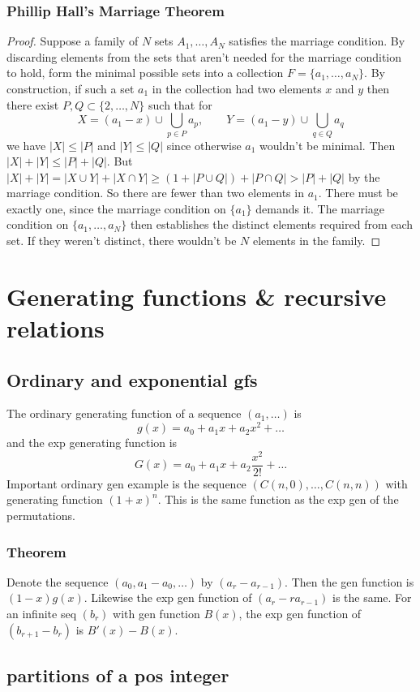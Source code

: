 \documentclass{article}
\begin{document}
\subsubsection{Phillip Hall's Marriage Theorem}
\begin{proof}
Suppose a family of $N$ sets $A_1, \hdots, A_N$ satisfies the marriage condition.
By discarding elements from the sets
that aren't needed for the marriage condition to hold,
form the minimal possible sets into a collection $F = \{ a_1, \hdots, a_N \}$.
By construction, if such a set $a_1$ in the collection
had two elements $x$ and $y$ then there exist $P,Q \subset \{2,\hdots, N\}$ such that for
$$
X = (a_1 - x) \cup \bigcup_{p \in P} a_p, \quad \quad Y = (a_1 - y) \cup \bigcup_{q \in Q} a_q
$$
we have $|X| \leq |P|$ and $|Y| \leq |Q|$ since otherwise $a_1$ wouldn't be minimal.
Then $|X|+|Y| \leq |P|+|Q|$.
But $|X|+|Y| = |X \cup Y| + |X \cap Y| \geq (1 + |P \cup Q|) + |P \cap Q| > |P| + |Q|$
by the marriage condition. So there are fewer than two elements in $a_1$.
There must be exactly one, since the marriage condition on $\{a_1\}$ demands it.
The marriage condition on $\{a_1,\hdots,a_N\}$ then establishes the distinct
elements required from each set. If they weren't distinct, there wouldn't be $N$
elements in the family.
\end{proof}
\section{Generating functions \& recursive relations}
\subsection{Ordinary and exponential gfs}
The ordinary generating function of a sequence $(a_1,\hdots)$ is $$
g(x) = a_0 + a_1 x + a_2 x^2 + \hdots
$$
and the exp generating function is $$
G(x) = a_0 + a_1 x + a_2\frac{x^2}{2!} + \hdots
$$
Important ordinary gen example is the sequence $(C(n,0),\hdots,C(n,n))$ with generating function $(1+x)^n$. This is the same function as the exp gen of the permutations.
\subsubsection{Theorem}
Denote the sequence $(a_0,a_1-a_0,\hdots)$ by $(a_r - a_{r-1})$.
Then the gen function is $(1-x)g(x)$. Likewise the exp gen function
of $(a_r-ra_{r-1})$ is the same. For an infinite seq $(b_r)$ with gen function $B(x)$,
the exp gen function of $(b_{r+1}-b_r)$ is $B'(x) - B(x)$.
\subsection{partitions of a pos integer}
\end{document}
